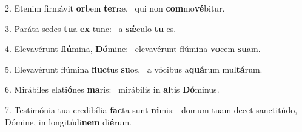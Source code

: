 2. Etenim firmávit \textbf{or}bem \textbf{ter}ræ, \ast\  qui non \textbf{com}mo\textbf{vé}bitur.\

3. Paráta sedes \textbf{tu}a \textbf{ex} tunc: \ast\  a \textbf{sǽ}culo \textbf{tu} es.\

4. Elevavérunt \textbf{flú}mina, \textbf{Dó}mine: \ast\  elevavérunt flúmina \textbf{vo}cem \textbf{su}am.\

5. Elevavérunt flúmina \textbf{fluc}tus \textbf{su}os, \ast\  a vócibus a\textbf{quá}rum mul\textbf{tá}rum.\

6. Mirábiles elati\textbf{ó}nes \textbf{ma}ris: \ast\  mirábilis in \textbf{al}tis \textbf{Dó}minus.\

7. Testimónia tua credibília \textbf{fac}ta sunt \textbf{ni}mis: \ast\  domum tuam decet sanctitúdo, Dómine, in longitúdi\textbf{nem} di\textbf{é}rum.\

